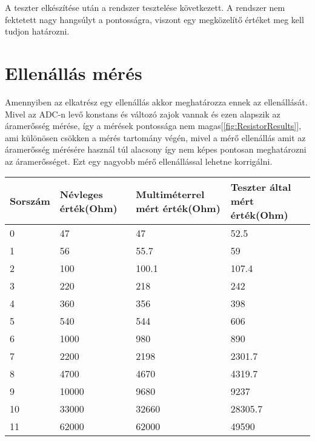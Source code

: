 A teszter elkészítése után a rendszer tesztelése következett.
A rendszer nem fektetett nagy hangsúlyt a pontosságra, viszont egy 
megközelítő értéket meg kell tudjon határozni.

\section{Ellenállás mérés}

Amennyiben az elkatrész egy ellenállás akkor meghatározza ennek az ellenállását.
Mivel az ADC-n levő konstans és változó zajok vannak és ezen alapszik 
az áramerősség mérése, így a mérések pontossága nem magas[\ref{fig:ResistorResults}], ami különösen csökken a mérés tartomány
végén, mivel a mérő ellenállás amit az áramerősség mérésére használ túl alacsony így
nem képes pontosan meghatározni az áramerősséget. Ezt egy nagyobb mérő ellenállással
lehetne korrigálni.


\begin{table}[H]
    \begin{tabular}{|l|l|l|l|}
    \hline
    Sorszám & Névleges érték(Ohm) & Multiméterrel mért érték(Ohm) & Teszter által mért érték(Ohm) \\ \hline
    0       & 47             & 47                       & 52.5                     \\ \hline
    1       & 56             & 55.7                     & 59                       \\ \hline
    2       & 100            & 100.1                    & 107.4                    \\ \hline
    3       & 220            & 218                      & 242                      \\ \hline
    4       & 360            & 356                      & 398                      \\ \hline
    5       & 540            & 544                      & 606                      \\ \hline
    6       & 1000           & 980                      & 890                      \\ \hline
    7       & 2200           & 2198                     & 2301.7                   \\ \hline
    8       & 4700           & 4670                     & 4319.7                   \\ \hline
    9       & 10000          & 9680                     & 9237                     \\ \hline
    10      & 33000          & 32660                    & 28305.7                  \\ \hline
    11      & 62000          & 62000                    & 49590                    \\ \hline
    \end{tabular}
    \end{table}

